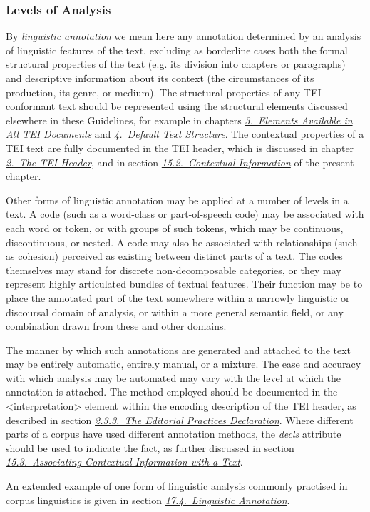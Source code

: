 \subsubsection[{Levels of Analysis}]{Levels of Analysis}\label{CCAN1}\par
By \textit{linguistic annotation} we mean here any annotation determined by an analysis of linguistic features of the text, excluding as borderline cases both the formal structural properties of the text (e.g. its division into chapters or paragraphs) and descriptive information about its context (the circumstances of its production, its genre, or medium). The structural properties of any TEI-conformant text should be represented using the structural elements discussed elsewhere in these Guidelines, for example in chapters \textit{\hyperref[CO]{3.\ Elements Available in All TEI Documents}} and \textit{\hyperref[DS]{4.\ Default Text Structure}}. The contextual properties of a TEI text are fully documented in the TEI header, which is discussed in chapter \textit{\hyperref[HD]{2.\ The TEI Header}}, and in section \textit{\hyperref[CCAH]{15.2.\ Contextual Information}} of the present chapter.\par
Other forms of linguistic annotation may be applied at a number of levels in a text. A code (such as a word-class or part-of-speech code) may be associated with each word or token, or with groups of such tokens, which may be continuous, discontinuous, or nested. A code may also be associated with relationships (such as cohesion) perceived as existing between distinct parts of a text. The codes themselves may stand for discrete non-decomposable categories, or they may represent highly articulated bundles of textual features. Their function may be to place the annotated part of the text somewhere within a narrowly linguistic or discoursal domain of analysis, or within a more general semantic field, or any combination drawn from these and other domains. \par
The manner by which such annotations are generated and attached to the text may be entirely automatic, entirely manual, or a mixture. The ease and accuracy with which analysis may be automated may vary with the level at which the annotation is attached. The method employed should be documented in the \hyperref[TEI.interpretation]{<interpretation>} element within the encoding description of the TEI header, as described in section \textit{\hyperref[HD53]{2.3.3.\ The Editorial Practices Declaration}}. Where different parts of a corpus have used different annotation methods, the {\itshape decls} attribute should be used to indicate the fact, as further discussed in section \textit{\hyperref[CCAS]{15.3.\ Associating Contextual Information with a Text}}.\par
An extended example of one form of linguistic analysis commonly practised in corpus linguistics is given in section \textit{\hyperref[AILA]{17.4.\ Linguistic Annotation}}.
